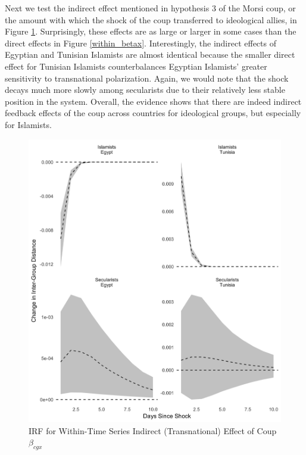 \documentclass[12pt]{article}
\begin{document}
Next we test the indirect effect mentioned in hypothesis 3 of the Morsi coup, or the amount with which the shock of the coup transferred to ideological allies, in Figure \ref{indirect_betax}. Surprisingly, these effects are as large or larger in some cases than the direct effects in Figure \ref{within_betax}. Interestingly, the indirect effects of Egyptian and Tunisian Islamists are almost identical because the smaller direct effect for Tunisian Islamists counterbalances Egyptian Islamists' greater sensitivity to transnational polarization. Again, we would note that the shock decays much more slowly among secularists due to their relatively less stable position in the system. Overall, the evidence shows that there are indeed indirect feedback effects of the coup across countries for ideological groups, but especially for Islamists.
 \begin{figure}[!h]
	\centering
	\caption{IRF for Within-Time Series Indirect (Transnational) Effect of Coup $\beta_{cgx}$}\label{indirect_betax}
	\centering
	\includegraphics[width=.9\linewidth]{irf_betax_other}
\end{figure}
\end{document}
